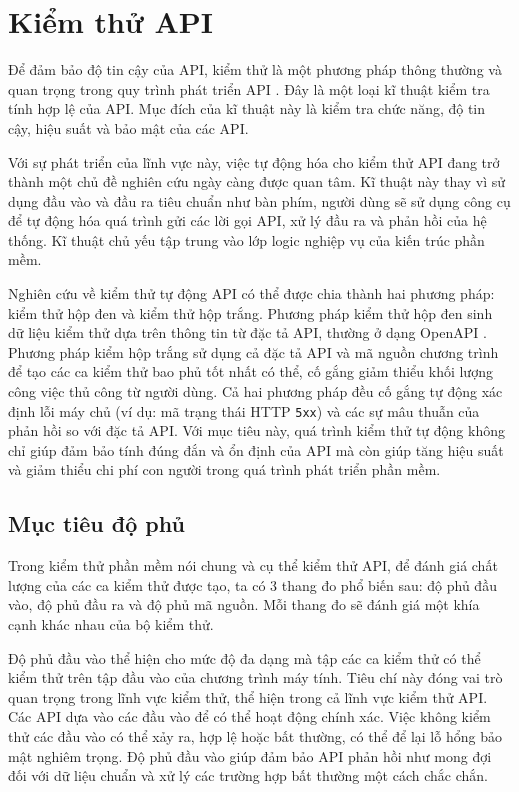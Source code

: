 \section{Kiểm thử API}
Để đảm bảo độ tin cậy của API, kiểm thử là một phương pháp thông thường và quan trọng trong quy trình phát triển API \cite{9034254}. Đây là một loại kĩ thuật kiểm tra tính hợp lệ của API. Mục đích của kĩ thuật này là kiểm tra chức năng, độ tin cậy, hiệu suất và bảo mật của các API.

Với sự phát triển của lĩnh vực này, việc tự động hóa cho kiểm thử API đang trở thành một chủ đề nghiên cứu ngày càng được quan tâm. Kĩ thuật này thay vì sử dụng đầu vào và đầu ra tiêu chuẩn như bàn phím, người dùng sẽ sử dụng công cụ để tự động hóa quá trình gửi các lời gọi API, xử lý đầu ra và phản hồi của hệ thống. Kĩ thuật chủ yếu tập trung vào lớp logic nghiệp vụ của kiến trúc phần mềm.

Nghiên cứu về kiểm thử tự động API có thể được chia thành hai phương pháp: kiểm thử hộp đen và kiểm thử hộp trắng. Phương pháp kiểm thử hộp đen sinh dữ liệu kiểm thử dựa trên thông tin từ  đặc tả API, thường ở dạng OpenAPI \cite{OpenAPI}. Phương pháp kiểm hộp trắng sử dụng cả đặc tả API và mã nguồn chương trình để tạo các ca kiểm thử bao phủ tốt nhất có thể, cố gắng giảm thiểu khối lượng công việc thủ công từ người dùng. Cả hai phương pháp đều cố gắng tự động xác định lỗi máy chủ (ví dụ: mã trạng thái HTTP \texttt{5xx}) và các sự mâu thuẫn của phản hồi so với đặc tả API. Với mục tiêu này, quá trình kiểm thử tự động không chỉ giúp đảm bảo tính đúng đắn và ổn định của API mà còn giúp tăng hiệu suất và giảm thiểu chi phí con người trong quá trình phát triển phần mềm.

\subsection{Mục tiêu độ phủ}

Trong kiểm thử phần mềm nói chung và cụ thể kiểm thử API, để đánh giá chất lượng của các ca kiểm thử được tạo, ta có 3 thang đo phổ biến sau: độ phủ đầu vào, độ phủ đầu ra và độ phủ mã nguồn. Mỗi thang đo sẽ đánh giá một khía cạnh khác nhau của bộ kiểm thử.

Độ phủ đầu vào thể hiện cho mức độ đa dạng mà tập các ca kiểm thử có thể kiểm thử trên tập đầu vào của chương trình máy tính. Tiêu chí này đóng vai trò quan trọng trong lĩnh vực kiểm thử, thể hiện trong cả lĩnh vực kiểm thử API. Các API dựa vào các đầu vào để có thể hoạt động chính xác. Việc không kiểm thử các đầu vào có thể xảy ra, hợp lệ hoặc bất thường, có thể để lại lỗ hổng bảo mật nghiêm trọng. Độ phủ đầu vào giúp đảm bảo API phản hồi như mong đợi đối với dữ liệu chuẩn và xử lý các trường hợp bất thường một cách chắc chắn.

